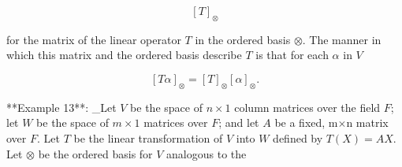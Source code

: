 \[[T]_{\otimes}\]

for the matrix of the linear operator \(T\) in the ordered basis \(\otimes\). The manner in which this matrix and the ordered basis describe \(T\) is that for each \(\alpha\) in \(V\)

\[[T\alpha]_{\otimes}=[T]_{\otimes}[\alpha]_{\otimes}.\]

**Example 13**: _Let \(V\) be the space of \(n\times 1\) column matrices over the field \(F\); let \(W\) be the space of \(m\times 1\) matrices over \(F\); and let \(A\) be a fixed, m\(\times\)n matrix over \(F\). Let \(T\) be the linear transformation of \(V\) into \(W\) defined by \(T(X)=AX\). Let \(\otimes\) be the ordered basis for \(V\) analogous to the 